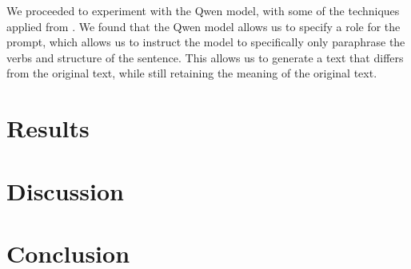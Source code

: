 \documentclass{article}
\begin{document}
We proceeded to experiment with the Qwen model, with some of the techniques
applied from \cite{promptingguide}. We found that the Qwen model allows us to
specify a role for the prompt, which allows us to instruct the model to
specifically only paraphrase the verbs and structure of the sentence. This
allows us to generate a text that differs from the original text, while still
retaining the meaning of the original text.

\section{Results}

\section{Discussion}

\section{Conclusion}



\end{document}

